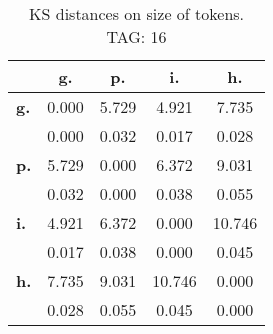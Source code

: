 \begin{table}[h!]
\begin{center}
\begin{tabular}{| l || c | c | c | c |}\hline
 & {\bf g.} & {\bf p.} & {\bf i.} & {\bf h.} \\\hline\hline
{\bf g.} & 0.000 & 5.729 & 4.921 & 7.735 \\
{\bf } & 0.000 & 0.032 & 0.017 & 0.028 \\\hline
{\bf p.} & 5.729 & 0.000 & 6.372 & 9.031 \\
{\bf } & 0.032 & 0.000 & 0.038 & 0.055 \\\hline
{\bf i.} & 4.921 & 6.372 & 0.000 & 10.746 \\
{\bf } & 0.017 & 0.038 & 0.000 & 0.045 \\\hline
{\bf h.} & 7.735 & 9.031 & 10.746 & 0.000 \\
{\bf } & 0.028 & 0.055 & 0.045 & 0.000 \\\hline
\end{tabular}
\caption{KS distances on size of tokens. TAG: 16}
\end{center}
\end{table}